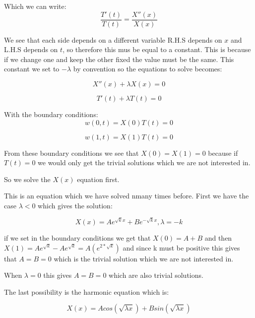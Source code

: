 \documentclass[a4paper,10pt]{article}
\begin{document}
Which we can write:
\begin{equation}
 \frac{T'(t)}{T(t)} = \frac{X''(x)}{X(x)}
\end{equation}

We see that each side depends on a different variable R.H.S depends on $x$ and L.H.S depends on $t$, so therefore this mus be equal to a constant.
This is because if we change one and keep the other fixed the value must be the same. This constant we set to $-\lambda$ by convention so the equations
to solve becomes:

\begin{equation}
 X''(x) + \lambda X(x) = 0
\end{equation}

\begin{equation}
 T'(t) + \lambda T(t) = 0
\end{equation}

With the boundary conditions:
\begin{equation}
 w(0,t) = X(0)T(t) = 0
\end{equation}

\begin{equation}
 w(1,t) = X(1)T(t) = 0
\end{equation}

From these boundary conditions we see that $X(0) = X(1) = 0$ because if $T(t)=0$ we would only get the trivial solutions which we are not interested in.

So we solve the $X(x)$ equation first.

This is an equation which we have solved nmany times before. First we have the case $\lambda < 0$ which gives the solution:

\begin{equation}
  X(x) = Ae^{\sqrt{k}x} + Be^{-\sqrt{k}x}, \lambda=-k
\end{equation}

if we set in the boundary conditions we get that $X(0) = A+B$ and then $X(1) = Ae^{\sqrt{k}} - Ae^{\sqrt{k}} = A(e^{2*\sqrt{k}})$ and since k must
be positive this gives that $A=B=0$ which is the trivial solution which we are not interested in.

When $\lambda = 0 $ this gives $A=B=0$ which are also trivial solutions.

The last possibility is the harmonic equation which is:

\begin{equation}
  X(x) = Acos(\sqrt{\lambda x}) + Bsin(\sqrt{\lambda x})
\end{equation}
\end{document}
